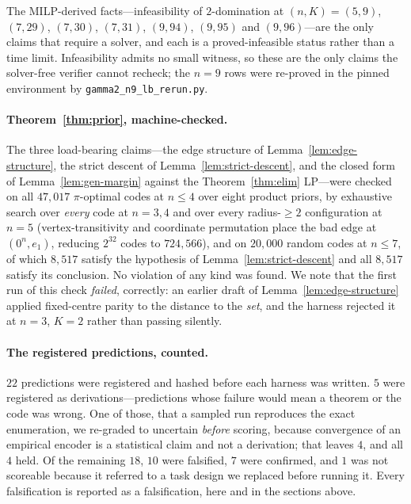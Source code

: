The MILP-derived facts---infeasibility of $2$-domination at $(n,K) = (5,9)$,
$(7,29)$, $(7,30)$, $(7,31)$, $(9,94)$, $(9,95)$ and $(9,96)$---are the only
claims that require a solver, and each is a proved-infeasible status rather than
a time limit. Infeasibility admits no small witness, so these are the only claims
the solver-free verifier cannot recheck; the $n=9$ rows were re-proved in the
pinned environment by \texttt{gamma2\_n9\_lb\_rerun.py}.

\paragraph{Theorem~\ref{thm:prior}, machine-checked.}
The three load-bearing claims---the edge structure of
Lemma~\ref{lem:edge-structure}, the strict descent of
Lemma~\ref{lem:strict-descent}, and the closed form of
Lemma~\ref{lem:gen-margin} against the Theorem~\ref{thm:elim} LP---were checked
on all $47{,}017$ $\pi$-optimal codes at $n \le 4$ over eight product priors, by
exhaustive search over \emph{every} code at $n = 3,4$ and over every
radius-$\ge 2$ configuration at $n = 5$ (vertex-transitivity and coordinate
permutation place the bad edge at $(0^n, e_1)$, reducing $2^{32}$ codes to
$724{,}566$), and on $20{,}000$ random codes at $n \le 7$, of which $8{,}517$
satisfy the hypothesis of Lemma~\ref{lem:strict-descent} and all $8{,}517$
satisfy its conclusion. No violation of any kind was found. We note that the
first run of this check \emph{failed}, correctly: an earlier draft of
Lemma~\ref{lem:edge-structure} applied fixed-centre parity to the distance to the
\emph{set}, and the harness rejected it at $n=3$, $K=2$ rather than passing
silently.

\paragraph{The registered predictions, counted.}
$22$ predictions were registered and hashed before each harness was written. $5$
were registered as derivations---predictions whose failure would mean a theorem
or the code was wrong. One of those, that a sampled run reproduces the exact
enumeration, we re-graded to uncertain \emph{before} scoring, because convergence
of an empirical encoder is a statistical claim and not a derivation; that leaves
$4$, and all $4$ held. Of the remaining $18$, $10$ were falsified, $7$ were
confirmed, and $1$ was not scoreable because it referred to a task design we
replaced before running it. Every falsification is reported as a falsification,
here and in the sections above.
